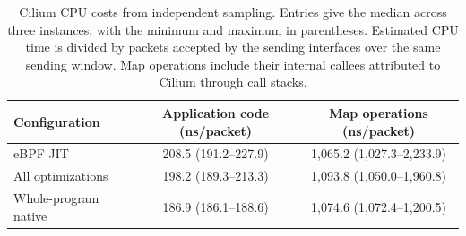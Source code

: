 \begin{table}[t]
\centering
\small
\caption{Cilium CPU costs from independent sampling. Entries give the median across three instances, with the minimum and maximum in parentheses. Estimated CPU time is divided by packets accepted by the sending interfaces over the same sending window. Map operations include their internal callees attributed to Cilium through call stacks.}
\label{tab:eval-cilium-profile}
\setlength{\tabcolsep}{5pt}
\renewcommand{\arraystretch}{1.08}
\begin{tabular*}{\textwidth}{@{\extracolsep{\fill}}lcc@{}}
\toprule
\textbf{Configuration} & \textbf{Application code (ns/packet)} & \textbf{Map operations (ns/packet)} \\
\midrule
eBPF JIT & 208.5 (191.2--227.9) & 1,065.2 (1,027.3--2,233.9) \\
All optimizations & 198.2 (189.3--213.3) & 1,093.8 (1,050.0--1,960.8) \\
Whole-program native & 186.9 (186.1--188.6) & 1,074.6 (1,072.4--1,200.5) \\
\bottomrule
\end{tabular*}
\end{table}
